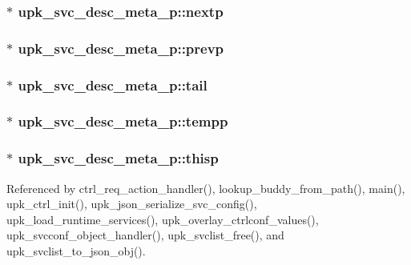 \subsubsection[{nextp}]{ $\ast$ {\bf upk\_\-svc\_\-desc\_\-meta\_\-p::nextp}}\label{structupk__svc__desc__meta__p_ad2847a4f692fd4afbcaf6fe35e5ef8ab}
\subsubsection[{prevp}]{ $\ast$ {\bf upk\_\-svc\_\-desc\_\-meta\_\-p::prevp}}\label{structupk__svc__desc__meta__p_a9ea8c1a66bcc43c9cc43f7bbe432327a}
\subsubsection[{tail}]{ $\ast$ {\bf upk\_\-svc\_\-desc\_\-meta\_\-p::tail}}\label{structupk__svc__desc__meta__p_a6e7c49f78c8d1d2378e44fdd1f31a661}
\subsubsection[{tempp}]{ $\ast$ {\bf upk\_\-svc\_\-desc\_\-meta\_\-p::tempp}}\label{structupk__svc__desc__meta__p_a629bb60cc897dcf320361bb227ee62b6}
\subsubsection[{thisp}]{ $\ast$ {\bf upk\_\-svc\_\-desc\_\-meta\_\-p::thisp}}\label{structupk__svc__desc__meta__p_a1b5765fbff27a4313dea5b940b546c89}


Referenced by ctrl\_\-req\_\-action\_\-handler(), lookup\_\-buddy\_\-from\_\-path(), main(), upk\_\-ctrl\_\-init(), upk\_\-json\_\-serialize\_\-svc\_\-config(), upk\_\-load\_\-runtime\_\-services(), upk\_\-overlay\_\-ctrlconf\_\-values(), upk\_\-svcconf\_\-object\_\-handler(), upk\_\-svclist\_\-free(), and upk\_\-svclist\_\-to\_\-json\_\-obj().

